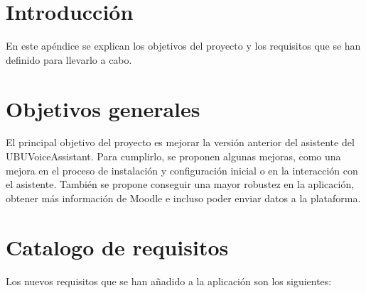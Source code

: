 
\section{Introducción}
En este apéndice se explican los objetivos del proyecto y los requisitos que se han definido para llevarlo a cabo.

\section{Objetivos generales}
El principal objetivo del proyecto es mejorar la versión anterior del asistente del UBUVoiceAssistant. Para cumplirlo, se proponen algunas mejoras, como una mejora en el proceso de instalación y configuración inicial o en la interacción con el asistente. También se propone conseguir una mayor robustez en la aplicación, obtener más información de Moodle e incluso poder enviar datos a la plataforma.

\section{Catalogo de requisitos}
Los nuevos requisitos que se han añadido a la aplicación son los siguientes:
